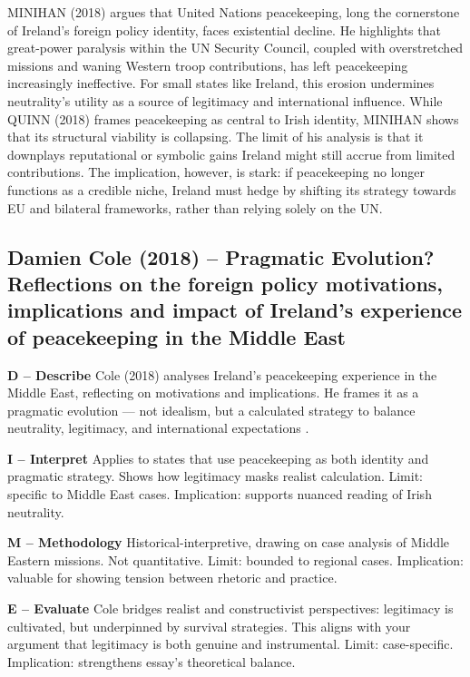 \nocite{MINIHAN_2018}MINIHAN (2018) argues that United Nations peacekeeping, long the cornerstone of Ireland’s foreign policy identity, faces existential decline. He highlights that great-power paralysis within the UN Security Council, coupled with overstretched missions and waning Western troop contributions, has left peacekeeping increasingly ineffective. For small states like Ireland, this erosion undermines neutrality’s utility as a source of legitimacy and international influence. While QUINN (2018) frames peacekeeping as central to Irish identity, MINIHAN shows that its structural viability is collapsing. The limit of his analysis is that it downplays reputational or symbolic gains Ireland might still accrue from limited contributions. The implication, however, is stark: if peacekeeping no longer functions as a credible niche, Ireland must hedge by shifting its strategy towards EU and bilateral frameworks, rather than relying solely on the UN.

\subsection*{Damien Cole (2018) – Pragmatic Evolution? Reflections on the foreign policy motivations, implications and impact of Ireland’s experience of peacekeeping in the Middle East}

\textbf{D – Describe}  
Cole (2018) analyses Ireland’s peacekeeping experience in the Middle East, reflecting on motivations and implications. He frames it as a pragmatic evolution — not idealism, but a calculated strategy to balance neutrality, legitimacy, and international expectations \parencite{COLE_2018}.

\textbf{I – Interpret}  
Applies to states that use peacekeeping as both identity and pragmatic strategy. Shows how legitimacy masks realist calculation. Limit: specific to Middle East cases. Implication: supports nuanced reading of Irish neutrality.

\textbf{M – Methodology}  
Historical-interpretive, drawing on case analysis of Middle Eastern missions. Not quantitative. Limit: bounded to regional cases. Implication: valuable for showing tension between rhetoric and practice.

\textbf{E – Evaluate}  
Cole bridges realist and constructivist perspectives: legitimacy is cultivated, but underpinned by survival strategies. This aligns with your argument that legitimacy is both genuine and instrumental. Limit: case-specific. Implication: strengthens essay’s theoretical balance.

